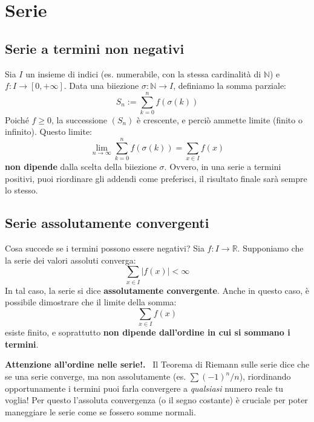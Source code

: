 \documentclass[11pt, a4paper]{report}
\theoremstyle{plain}
\theoremstyle{definition}
\theoremstyle{remark}
\newenvironment{hint}[1][Hint]
{\begin{mdframed}[backgroundcolor=blue!5, linecolor=blue!50, linewidth=2pt, topline=false, rightline=false, bottomline=false]
\textbf{\textsf{#1.}}\ }
{\end{mdframed}}
\newcommand{\R}{\mathbb{R}}
\newcommand{\N}{\mathbb{N}}
\newcommand{\1}{\mathbf{1}}
\begin{document}
\section{Serie}

\subsection{Serie a termini non negativi}

Sia $I$ un insieme di indici (es. numerabile, con la stessa cardinalità di $\N$) e $f : I \to [0, +\infty]$. Data una biiezione $\sigma : \N \to I$, definiamo la somma parziale:
\[ S_n := \sum_{k=0}^n f(\sigma(k)) \]
Poiché $f \ge 0$, la successione $(S_n)$ è crescente, e perciò ammette limite (finito o infinito). Questo limite:
\[ \lim_{n \to \infty} \sum_{k=0}^n f(\sigma(k)) = \sum_{x \in I} f(x) \]
\textbf{non dipende} dalla scelta della biiezione $\sigma$. Ovvero, in una serie a termini positivi, puoi riordinare gli addendi come preferisci, il risultato finale sarà sempre lo stesso.

\subsection{Serie assolutamente convergenti}

Cosa succede se i termini possono essere negativi? Sia $f : I \to \R$.
Supponiamo che la serie dei valori assoluti converga:
\[ \sum_{x \in I} |f(x)| < \infty \]
In tal caso, la serie si dice \textbf{assolutamente convergente}. Anche in questo caso, è possibile dimostrare che il limite della somma:
\[ \sum_{x \in I} f(x) \]
esiste finito, e soprattutto \textbf{non dipende dall'ordine in cui si sommano i termini}.

\begin{hint}[Attenzione all'ordine nelle serie!]
Il Teorema di Riemann sulle serie dice che se una serie converge, ma non assolutamente (es. $\sum (-1)^n / n$), riordinando opportunamente i termini puoi farla convergere a \emph{qualsiasi} numero reale tu voglia! Per questo l'assoluta convergenza (o il segno costante) è cruciale per poter maneggiare le serie come se fossero somme normali.
\end{hint}
\end{document}
